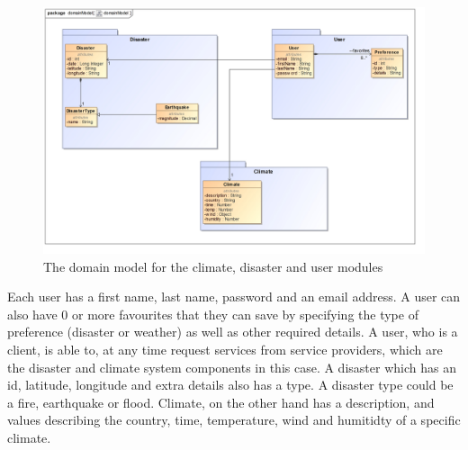 \begin{figure}[H]
	\centering
	\includegraphics[width=1.0\textwidth]{../images/funcReq/domainModel.jpg}
	\caption{The domain model for the climate, disaster and user modules \label{overflow}}
\end{figure} Each user has a first name, last name, password and an email address. A user can also have 0 or more favourites that they can save by specifying the type of preference (disaster or weather) as well as other required details. A user, who is a client, is able to, at any time request services from service providers, which are the disaster and climate system components in this case. A disaster which has an id, latitude, longitude and extra details also has a type. A disaster type could be a fire, earthquake or flood. Climate, on the other hand has a description, and values describing the country, time, temperature, wind and humitidty of a specific climate.